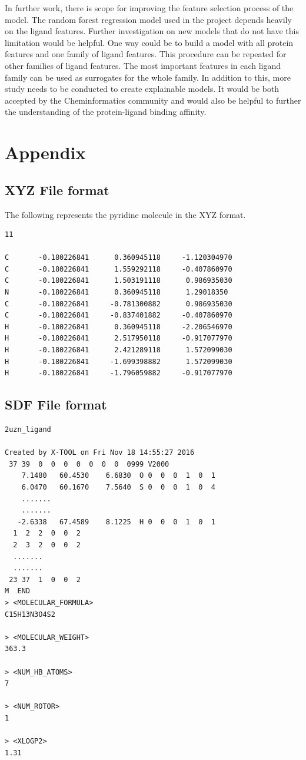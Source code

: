 \documentclass[11pt]{article}
\begin{document}
In further work,  there is scope for improving the feature selection process of the model.
The random forest regression model used in the project depends heavily on the ligand features.
Further investigation on new models that do not have this limitation would be helpful.
One way could be to build a model with all protein features and one family of ligand features. This procedure can be repeated for other families of ligand features.
The most important features in each ligand family can be used as surrogates for the whole family.
In addition to this, more study needs to be conducted to create explainable models.
It would be both accepted by the Cheminformatics community and would also be helpful to further the understanding of the protein-ligand binding affinity.




\section{Appendix}
\subsection{XYZ File format}
\label{XYZFileexampleref}
The following represents the pyridine molecule in the XYZ format.
\begin{verbatim}
11

C       -0.180226841      0.360945118     -1.120304970
C       -0.180226841      1.559292118     -0.407860970
C       -0.180226841      1.503191118      0.986935030
N       -0.180226841      0.360945118      1.29018350
C       -0.180226841     -0.781300882      0.986935030
C       -0.180226841     -0.837401882     -0.407860970
H       -0.180226841      0.360945118     -2.206546970
H       -0.180226841      2.517950118     -0.917077970
H       -0.180226841      2.421289118      1.572099030
H       -0.180226841     -1.699398882      1.572099030
H       -0.180226841     -1.796059882     -0.917077970
\end{verbatim}

\subsection{SDF File format}
\label{SDFFileexampleref}
\begin{verbatim}
2uzn_ligand

Created by X-TOOL on Fri Nov 18 14:55:27 2016
 37 39  0  0  0  0  0  0  0  0999 V2000
    7.1480   60.4530    6.6830  O 0  0  0  1  0  1
    6.0470   60.1670    7.5640  S 0  0  0  1  0  4
    .......
    .......
   -2.6338   67.4589    8.1225  H 0  0  0  1  0  1
  1  2  2  0  0  2
  2  3  2  0  0  2
  .......
  .......
 23 37  1  0  0  2
M  END
> <MOLECULAR_FORMULA>
C15H13N3O4S2

> <MOLECULAR_WEIGHT>
363.3

> <NUM_HB_ATOMS>
7  

> <NUM_ROTOR>
1  

> <XLOGP2>
1.31 
\end{verbatim}
\end{document}
